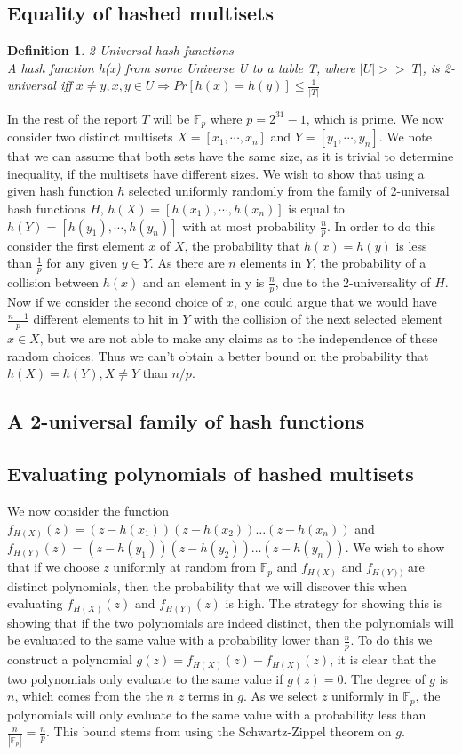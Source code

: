 \documentclass[article,a4paper,oneside]{article}
\newtheorem{definition}{Definition}
\newcommand{\+}[1]{\ensuremath{\boldsymbol{#1}}}
\begin{document}
\subsection*{Equality of hashed multisets}
\begin{definition}{2-Universal hash functions}\\
A hash function h(x) from some Universe \emph{U} to a table {T}, where $|U| >> |T|$, is 2\emph{-}universal iff $x \neq y, x,y \in U \Rightarrow Pr[h(x) = h(y)] \leq \frac{1}{|T|}$
\end{definition}
In the rest of the report $T$ will be $\mathbb{F}_p$ where $p = 2^{31} - 1$, which is prime.
We now consider two distinct multisets $X = \left[x_1,\cdots, x_n\right]$ and $Y = \left[y_1, \cdots, y_n\right]$. We note that we can assume that both sets have the same size, as it is trivial to determine inequality, if the multisets have different sizes.
We wish to show that using a given hash function $h$ selected uniformly randomly from the family of 2-universal hash functions $H$, $h(X) = \left[h(x_1),\cdots, h(x_n)\right]$ is equal to $h(Y) = \left[h(y_1),\cdots,h(y_n)\right]$ with at most probability $\frac{n}{p}$.
In order to do this consider the first element $x$ of $X$, the probability that $h(x) = h(y)$ is less than $\frac{1}{p}$ for any given $y \in Y$.
As there are $n$ elements in $Y$, the probability of a collision between $h(x)$ and an element in y is $\frac{n}{p}$, due to the 2-universality of $H$.
Now if we consider the second choice of $x$, one could argue that we would have $\frac{n-1}{p}$ different elements to hit in $Y$ with the collision of the next selected element $x \in X$,
but we are not able to make any claims as to the independence of these random choices. Thus we can't obtain a better bound on the probability that $h(X) = h(Y), X \neq Y$ than $n/p$.
\subsection*{A 2-universal family of hash functions}
\subsection*{Evaluating polynomials of hashed multisets}
We now consider the function $f_{H(X)}(z) = (z-h(x_1))(z-h(x_2))\ldots(z - h(x_n))$ and $f_{H(Y)}(z) = (z-h(y_1))(z-h(y_2))\ldots(z - h(y_n))$.
We wish to show that if we choose $z$ uniformly at random from $\mathbb{F}_p$ and $f_{H(X)}$ and $f_{H(Y))}$ are distinct polynomials, then the probability that we will discover this when evaluating $f_{H(X)}(z)$ and $f_{H(Y)}(z)$ is high. The strategy for showing this is showing that if the two polynomials are indeed distinct, then the polynomials will be evaluated to the same value with a probability lower than $\frac{n}{p}$.
To do this we construct a polynomial $g(z) = f_{H(X)}(z) - f_{H(X)}(z)$, it is clear that the two polynomials only evaluate to the same value if $g(z) = 0$. The degree of $g$ is $n$, which comes from the the $n$ $z$ terms in $g$.
As we select $z$ uniformly in $\mathbb{F}_p$, the polynomials will only evaluate to the same value with a probability less than $\frac{n}{|\mathbb{F}_p|} = \frac{n}{p}$. This bound stems from using the Schwartz-Zippel theorem on $g$.
\end{document}
